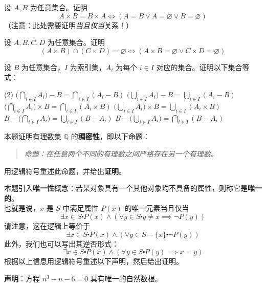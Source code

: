 \begin{exercise}
    设 $A, B$ 为任意集合。证明
    \[A \times B = B \times A \iff (A = B \lor A = \varnothing \lor B = \varnothing)\]
    （注意：此处需要证明\emph{当且仅当}关系！）
\end{exercise}

\begin{exercise}
    设 $A, B, C, D$ 为任意集合。证明
    \[(A \times B) \cap (C \times D) = \varnothing \iff (A \times B = \varnothing \lor C \times D = \varnothing) \]
\end{exercise}

\begin{exercise}
    设 $B$ 为任意集合，$I$ 为索引集，$A_i$ 为每个 $i \in I$ 对应的集合。证明以下集合等式：

    \begin{tasks}[label=(\alph*)](2)
        \task $\displaystyle \Bigg(\bigcap_{i \in I} A_i \Bigg) - B = \bigcap_{i \in I} (A_i - B)$
        \task $\displaystyle \Bigg(\bigcup_{i \in I} A_i \Bigg) - B = \bigcup_{i \in I} (A_i - B)$
        \task $\displaystyle \Bigg(\bigcap_{i \in I} A_i \Bigg) \times B = \bigcap_{i \in I} (A_i \times B)$
        \task $\displaystyle \Bigg(\bigcup_{i \in I} A_i \Bigg) \times B = \bigcup_{i \in I} (A_i \times B)$
        \task $\displaystyle B - \Bigg(\bigcap_{i \in I} A_i \Bigg) = \bigcup_{i \in I} (B - A_i)$
        \task $\displaystyle B - \Bigg(\bigcup_{i \in I} A_i \Bigg) = \bigcap_{i \in I} (B - A_i)$
    \end{tasks}  
\end{exercise}

\begin{exercise}\label{exc:exercises4.11.26}
    本题证明有理数集 $\mathbb{Q}$ 的\textbf{稠密性}，即以下命题：
    \begin{quote}
        \emph{命题：在任意两个不同的有理数之间严格存在另一个有理数。}
    \end{quote}
    用逻辑符号重述此命题，并给出\textbf{证明}。
\end{exercise}

\begin{exercise}
    本题引入\textbf{唯一性}概念：若某对象具有一个其他对象均不具备的属性，则称它是\textbf{唯一的}。\\
    也就是说，$x$ 是 $S$ 中满足属性 $P(x)$ 的唯一元素当且仅当
    \[\exists x \in S \centerdot P(x) \land (\forall y \in S \centerdot y \ne x \implies \neg P(y))\]
    请注意，这在逻辑上等价于
    \[\exists x \in S \centerdot P(x) \land (\forall y \in S - \{x\} \centerdot \neg P(y))\]
    此外，我们也可以写出其逆否形式：
    \[\exists x \in S \centerdot P(x) \land (\forall y \in S \centerdot P(y) \implies x = y)\]
    根据以上信息用逻辑符号重述以下声明，然后给出证明。
    \begin{center}
        \textbf{声明}：方程 $n^3 - n - 6 = 0$ 具有唯一的自然数根。
    \end{center}
\end{exercise}

